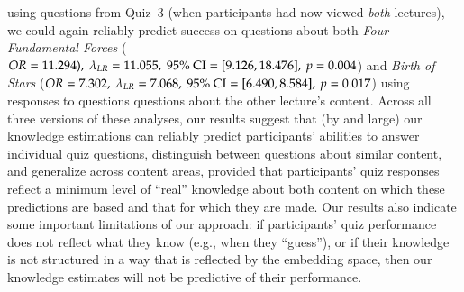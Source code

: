\documentclass[10pt]{article}
\begin{document}
using questions from Quiz~3 (when participants had now viewed \textit{both}
lectures), we could again reliably predict success on questions about both
\textit{Four Fundamental Forces} ($OR = 11.294),\ \lambda_{LR} = 11.055,\ 95\%\
\textnormal{CI} = [9.126, 18.476],\ p = 0.004$) and \textit{Birth of Stars}
($OR = 7.302,\ \lambda_{LR} = 7.068,\ 95\%\ \textnormal{CI} = [6.490, 8.584],\
p = 0.017$) using responses to questions questions about the other lecture's
content. Across all three versions of these analyses, our results suggest that
(by and large) our knowledge estimations can reliably predict participants'
abilities to answer individual quiz questions, distinguish between questions
about similar content, and generalize across content areas, provided that
participants' quiz responses reflect a minimum level of ``real'' knowledge
about both content on which these predictions are based and that for which they
are made. Our results also indicate some important limitations of our approach:
if participants' quiz performance does not reflect what they know (e.g., when
they ``guess''), or if their knowledge is not structured in a way that is
reflected by the embedding space, then our knowledge estimates will not be
predictive of their performance.


\end{document}
